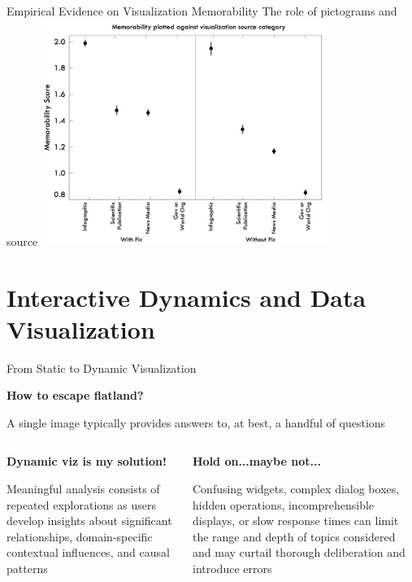 \documentclass[notes, aspectratio=1610]{beamer}
\begin{document}
\begin{frame}{Empirical Evidence on Visualization Memorability}
	{The role of pictograms and source}
	\centering
	\includegraphics[width=0.7\textwidth]{images/4_4}
\end{frame}

\section{Interactive Dynamics and Data Visualization}

\begin{frame}{From Static to Dynamic Visualization}{}
	\begin{center}
		\textbf{How to escape flatland?}
	\end{center}
	
	A single image typically provides answers to, at best, a handful of 
	questions

	\vspace{2em}

	\pause

\begin{columns}
	\begin{column}{0.5\textwidth}
		\begin{center}
			\textbf{Dynamic viz is my solution!}
		\end{center}

		Meaningful analysis consists of repeated explorations as users
		develop insights about significant relationships,
		domain-specific contextual influences, and causal patterns
	\end{column}

	\pause

	\begin{column}{0.5\textwidth}

		\begin{center}
			\textbf{Hold on...maybe not...}
		\end{center}
		Confusing widgets, complex dialog boxes, hidden operations,
		incomprehensible displays, or slow response times can limit the
		range and depth of topics considered and may curtail thorough
		deliberation and introduce errors
	\end{column}
\end{columns}

\end{frame}
\end{document}
